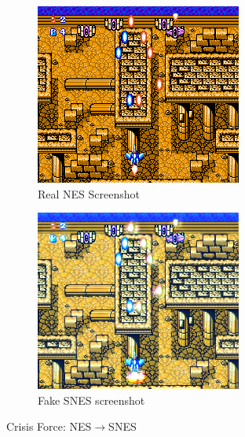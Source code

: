 \documentclass[10pt,twocolumn,letterpaper]{article}
\begin{document}
\begin{figure}[H]
   \centering
   \begin{subfigure}[b]{0.235\textwidth}
      \includegraphics[width=\textwidth]{figures/nes_to_snes/Crisis_Force_(J)__ucc__12_real_A.png}
      \caption{Real NES Screenshot}
      \label{fig:ss3a}
   \end{subfigure}
   \begin{subfigure}[b]{0.235\textwidth}
      \includegraphics[width=\textwidth]{figures/nes_to_snes/Crisis_Force_(J)__ucc__12_fake_B.png}
      \caption{Fake SNES screenshot}
      \label{fig:ss3b}
   \end{subfigure}
   \caption{Crisis Force: NES$\rightarrow$SNES}
\end{figure}
\end{document}
